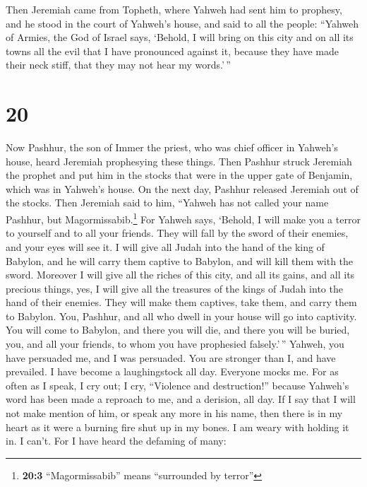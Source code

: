  Then Jeremiah came from Topheth, where Yahweh had sent
him to prophesy, and he stood in the court of Yahweh's house, and said
to all the people:  ``Yahweh of Armies, the God of Israel
says, `Behold, I will bring on this city and on all its towns all the
evil that I have pronounced against it, because they have made their
neck stiff, that they may not hear my words.'\,''

\hypertarget{section-19}{%
\section{20}\label{section-19}}

 Now Pashhur, the son of Immer the priest, who was chief
officer in Yahweh's house, heard Jeremiah prophesying these things.
 Then Pashhur struck Jeremiah the prophet and put him in
the stocks that were in the upper gate of Benjamin, which was in
Yahweh's house.  On the next day, Pashhur released
Jeremiah out of the stocks. Then Jeremiah said to him, ``Yahweh has not
called your name Pashhur, but Magormissabib.\footnote{\textbf{20:3}
  ``Magormissabib'' means ``surrounded by terror''}  For
Yahweh says, `Behold, I will make you a terror to yourself and to all
your friends. They will fall by the sword of their enemies, and your
eyes will see it. I will give all Judah into the hand of the king of
Babylon, and he will carry them captive to Babylon, and will kill them
with the sword.  Moreover I will give all the riches of
this city, and all its gains, and all its precious things, yes, I will
give all the treasures of the kings of Judah into the hand of their
enemies. They will make them captives, take them, and carry them to
Babylon.  You, Pashhur, and all who dwell in your house
will go into captivity. You will come to Babylon, and there you will
die, and there you will be buried, you, and all your friends, to whom
you have prophesied falsely.'\,''  Yahweh, you have
persuaded me, and I was persuaded. You are stronger than I, and have
prevailed. I have become a laughingstock all day. Everyone mocks me.
 For as often as I speak, I cry out; I cry, ``Violence and
destruction!'' because Yahweh's word has been made a reproach to me, and
a derision, all day.  If I say that I will not make
mention of him, or speak any more in his name, then there is in my heart
as it were a burning fire shut up in my bones. I am weary with holding
it in. I can't.  For I have heard the defaming of many:
